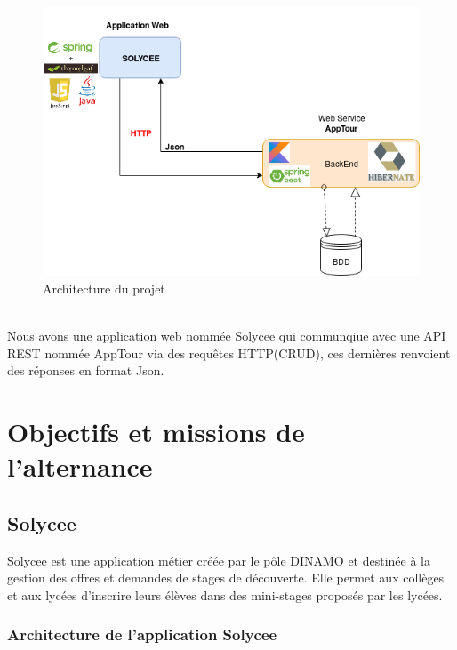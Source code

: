\documentclass[12pt]{article}
\begin{document}
\begin{figure}[H]
	\centering
 		\includegraphics[width=1\textwidth]{diagrammes/ArchitectureGenerale.png}
  		\caption{Architecture du projet}
	\end{figure}\\

Nous avons une application web nommée Solycee qui communqiue avec une API REST nommée AppTour via des requêtes HTTP(CRUD), ces dernières renvoient des réponses en format Json. 

\section{Objectifs et missions de l'alternance}

\subsection{Solycee}

Solycee est une application métier créée par le pôle DINAMO et destinée à la gestion des offres et demandes de stages de découverte. Elle permet aux collèges et aux lycées d'inscrire leurs élèves dans des mini-stages proposés par les lycées.  

 
\subsubsection{Architecture de l'application Solycee}
\end{document}
